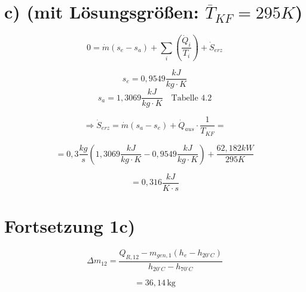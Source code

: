 \section*{c) (mit Lösungsgrößen: $\overline{T}_{KF} = 295 K$)}

\[
0 = \dot{m}(s_e - s_a) + \sum_i \left( \frac{\dot{Q}_i}{T_i} \right) + \dot{S}_{erz}
\]

\[
s_e = 0{,}9549 \frac{kJ}{kg \cdot K}
\]
\[
s_a = 1{,}3069 \frac{kJ}{kg \cdot K} \quad \text{Tabelle 4.2}
\]

\[
\Rightarrow \dot{S}_{erz} = \dot{m}(s_a - s_e) + \dot{Q}_{aus} \cdot \frac{1}{T_{KF}} = 
\]

\[
= 0{,}3 \frac{kg}{s} \left( 1{,}3069 \frac{kJ}{kg \cdot K} - 0{,}9549 \frac{kJ}{kg \cdot K} \right) + \frac{62{,}182 kW}{295 K}
\]

\[
= 0{,}316 \frac{kJ}{K \cdot s}
\]

\section*{Fortsetzung 1c)}

\begin{equation*}
\Delta m_{12} = \frac{Q_{R,12} - m_{gen,1} (h_{e} - h_{20^{\circ}C})}{h_{20^{\circ}C} - h_{70^{\circ}C}}
\end{equation*}

\begin{equation*}
= 36,14 \, \text{kg}
\end{equation*}